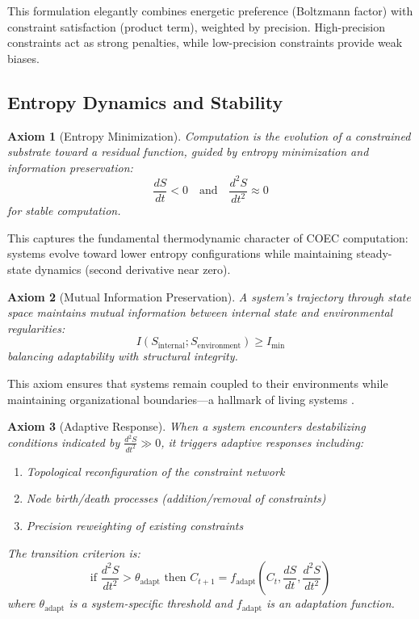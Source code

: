 \documentclass[11pt]{article}
\newtheorem{axiom}{Axiom}
\begin{document}
This formulation elegantly combines energetic preference (Boltzmann factor) with constraint satisfaction (product term), weighted by precision. High-precision constraints act as strong penalties, while low-precision constraints provide weak biases.

\subsection{Entropy Dynamics and Stability}

\begin{axiom}[Entropy Minimization]
Computation is the evolution of a constrained substrate toward a residual function, guided by entropy minimization and information preservation:
\begin{equation}
\frac{dS}{dt} < 0 \quad \text{and} \quad \frac{d^2S}{dt^2} \approx 0
\end{equation}
for stable computation.
\end{axiom}

This captures the fundamental thermodynamic character of COEC computation: systems evolve toward lower entropy configurations while maintaining steady-state dynamics (second derivative near zero).

\begin{axiom}[Mutual Information Preservation]
A system's trajectory through state space maintains mutual information between internal state and environmental regularities:
\begin{equation}
I(S_{\text{internal}}; S_{\text{environment}}) \geq I_{\text{min}}
\end{equation}
balancing adaptability with structural integrity.
\end{axiom}

This axiom ensures that systems remain coupled to their environments while maintaining organizational boundaries—a hallmark of living systems \citep{maturana1991autopoiesis}.

\begin{axiom}[Adaptive Response]
When a system encounters destabilizing conditions indicated by $\frac{d^2S}{dt^2} \gg 0$, it triggers adaptive responses including:
\begin{enumerate}
\item Topological reconfiguration of the constraint network
\item Node birth/death processes (addition/removal of constraints)
\item Precision reweighting of existing constraints
\end{enumerate}
The transition criterion is:
\begin{equation}
\text{if } \frac{d^2S}{dt^2} > \theta_{\text{adapt}} \text{ then } C_{t+1} = f_{\text{adapt}}\left(C_t, \frac{dS}{dt}, \frac{d^2S}{dt^2}\right)
\end{equation}
where $\theta_{\text{adapt}}$ is a system-specific threshold and $f_{\text{adapt}}$ is an adaptation function.
\end{axiom}
\end{document}
